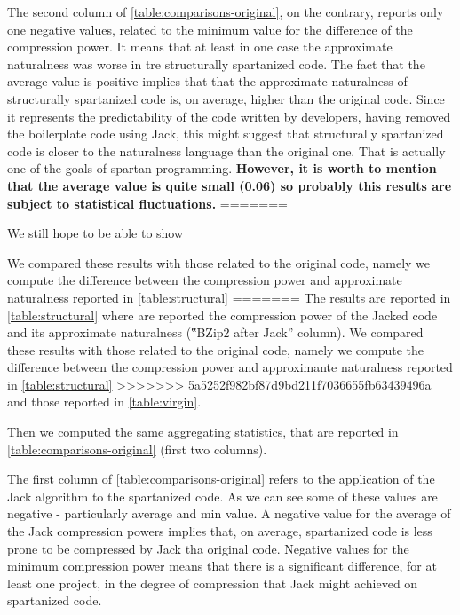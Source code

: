 The second column of \cref{table:comparisons-original}, on the contrary, reports only
one negative values, related to the minimum value for the difference of the compression power.
It means that at least in one case the approximate naturalness was worse in tre
structurally spartanized code. The fact that the average value is positive implies that
that the approximate naturalness of structurally spartanized
code is, on average, higher than the original code. Since it represents the predictability of
the code written by developers, having removed the boilerplate code using Jack, this
might suggest that structurally spartanized code is closer to the naturalness language
than the original one. That is actually one of the goals of spartan programming.
\textbf{However, it is worth to mention that the average value is quite small (0.06) so
probably this results are subject to statistical fluctuations.}
=======

We still hope to be able to show

We compared these results %
with those related to the original code, namely we compute the difference
between the compression power and approximate naturalness reported in \cref{table:structural}
=======
The results are reported in \cref{table:structural} where are reported
the compression power of the Jacked code and its approximate
naturalness (‟BZip2 after Jack” column).
We compared these results %
with those related to the original code, namely we compute the difference
between the compression power and approximante naturalness reported in \cref{table:structural}
>>>>>>> 5a5252f982bf87d9bd211f7036655fb63439496a
and those reported in \cref{table:virgin}.

Then we computed the same aggregating statistics, that are reported in
\cref{table:comparisons-original} (first two columns).


The first column of \cref{table:comparisons-original} refers to the application of the Jack
algorithm to the spartanized code. As we can see some of these values are negative - particularly
average and min value.
A negative value for the average of the Jack compression powers implies that,
on average, spartanized code is less prone to be compressed by Jack tha original code.
Negative values for the minimum compression power means
that there is a significant difference, for at least one project, in the degree of compression
that Jack might achieved on spartanized code.


